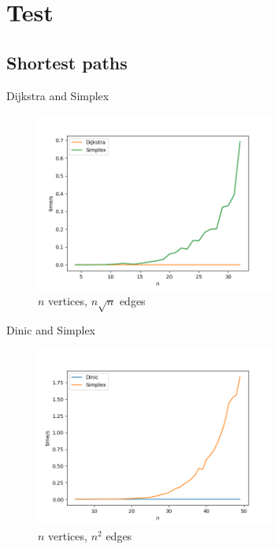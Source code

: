 \section{Test}

\subsection{Shortest paths}

\begin{frame}{Dijkstra and Simplex}

    \begin{figure}
        \includegraphics[width=0.7\textwidth]{assets/shortest_path_compare.png}
        \caption{$n$ vertices, $n\sqrt{n}$ edges}
    \end{figure}

\end{frame}

\begin{frame}{Dinic and Simplex}

    \begin{figure}
        \includegraphics[width=0.7\textwidth]{assets/maximum_flow_compare.png}
        \caption{$n$ vertices, $n^2$ edges}
    \end{figure}

\end{frame}